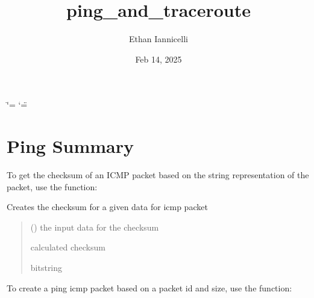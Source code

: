 \documentclass[letterpaper,10pt,english,openany,oneside]{sphinxmanual}
\title{ping\_and\_traceroute}
\date{Feb 14, 2025}
\author{Ethan Iannicelli}
\begin{document}
\ifdefined\shorthandoff
  \ifnum\catcode`\=\string=\active\shorthandoff{=}\fi
  \ifnum\catcode`\"=\active{}\fi
\fi

\pagestyle{empty}
\sphinxmaketitle
\pagestyle{plain}
\sphinxtableofcontents
\pagestyle{normal}
\label{\detokenize{index::doc}}



\chapter{Ping Summary}
\label{\detokenize{index:ping-summary}}
\sphinxAtStartPar
To get the checksum of an ICMP packet based on the
string representation of the packet, use the  function:

\begin{fulllineitems}
\label{\detokenize{index:my_ping.checksum}}
\pysigstartsignatures
\pysiglinewithargsret
{}
{}
{}
\pysigstopsignatures
\sphinxAtStartPar
Creates the checksum for a given data for icmp packet
\begin{quote}\begin{description}
\sphinxAtStartPar
{} () \textendash{} the input data for the checksum

\sphinxAtStartPar
calculated checksum

\sphinxAtStartPar
bitstring

\end{description}\end{quote}

\end{fulllineitems}


\sphinxAtStartPar
To create a ping icmp packet based on a packet id and size,
use the  function:
\end{document}
